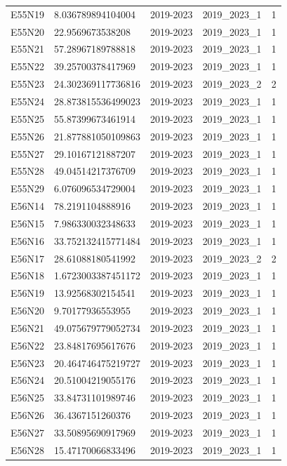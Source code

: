 \begin{landscape}
\begin{longtable}{lllll}
E55N19 & 8.036789894104004 & 2019-2023 & 2019\_2023\_1 & 1 \\
E55N20 & 22.9569673538208 & 2019-2023 & 2019\_2023\_1 & 1 \\
E55N21 & 57.28967189788818 & 2019-2023 & 2019\_2023\_1 & 1 \\
E55N22 & 39.25700378417969 & 2019-2023 & 2019\_2023\_1 & 1 \\
E55N23 & 24.302369117736816 & 2019-2023 & 2019\_2023\_2 & 2 \\
E55N24 & 28.873815536499023 & 2019-2023 & 2019\_2023\_1 & 1 \\
E55N25 & 55.87399673461914 & 2019-2023 & 2019\_2023\_1 & 1 \\
E55N26 & 21.877881050109863 & 2019-2023 & 2019\_2023\_1 & 1 \\
E55N27 & 29.10167121887207 & 2019-2023 & 2019\_2023\_1 & 1 \\
E55N28 & 49.04514217376709 & 2019-2023 & 2019\_2023\_1 & 1 \\
E55N29 & 6.076096534729004 & 2019-2023 & 2019\_2023\_1 & 1 \\
E56N14 & 78.2191104888916 & 2019-2023 & 2019\_2023\_1 & 1 \\
E56N15 & 7.986330032348633 & 2019-2023 & 2019\_2023\_1 & 1 \\
E56N16 & 33.752132415771484 & 2019-2023 & 2019\_2023\_1 & 1 \\
E56N17 & 28.61088180541992 & 2019-2023 & 2019\_2023\_2 & 2 \\
E56N18 & 1.6723003387451172 & 2019-2023 & 2019\_2023\_1 & 1 \\
E56N19 & 13.92568302154541 & 2019-2023 & 2019\_2023\_1 & 1 \\
E56N20 & 9.70177936553955 & 2019-2023 & 2019\_2023\_1 & 1 \\
E56N21 & 49.075679779052734 & 2019-2023 & 2019\_2023\_1 & 1 \\
E56N22 & 23.84817695617676 & 2019-2023 & 2019\_2023\_1 & 1 \\
E56N23 & 20.464746475219727 & 2019-2023 & 2019\_2023\_1 & 1 \\
E56N24 & 20.51004219055176 & 2019-2023 & 2019\_2023\_1 & 1 \\
E56N25 & 33.84731101989746 & 2019-2023 & 2019\_2023\_1 & 1 \\
E56N26 & 36.4367151260376 & 2019-2023 & 2019\_2023\_1 & 1 \\
E56N27 & 33.50895690917969 & 2019-2023 & 2019\_2023\_1 & 1 \\
E56N28 & 15.47170066833496 & 2019-2023 & 2019\_2023\_1 & 1 \\

\end{longtable}
\end{landscape}
